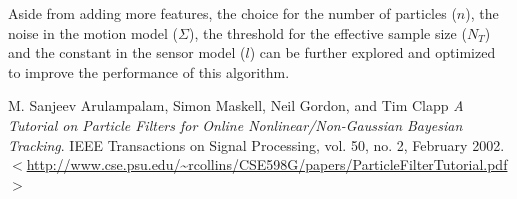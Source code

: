 \documentclass[10pt]{article}
\begin{document}
Aside from adding more features, the choice for the number of particles ($n$), the noise in the motion model ($\Sigma$), the threshold for the effective sample size ($N_T$) and the constant in the sensor model ($l$) can be further explored and optimized to improve the performance of this algorithm. 


\begin{thebibliography}{9}

  M. Sanjeev Arulampalam, Simon Maskell, Neil Gordon, and Tim Clapp
  \emph{A Tutorial on Particle Filters for Online
Nonlinear/Non-Gaussian Bayesian Tracking}.
  IEEE Transactions on Signal Processing, vol. 50, no. 2, 
  February 2002. $<$\url{http://www.cse.psu.edu/~rcollins/CSE598G/papers/ParticleFilterTutorial.pdf}$>$
\end{thebibliography}
\end{document}
